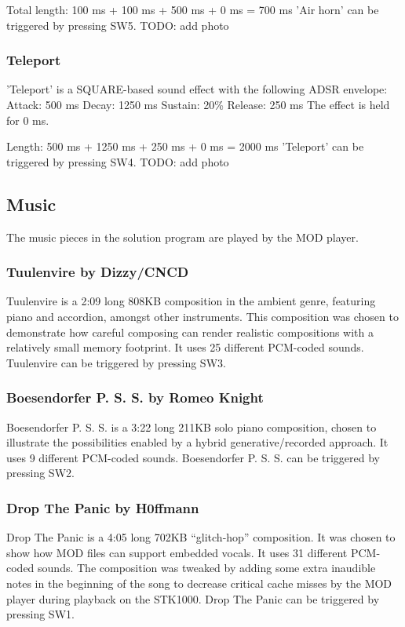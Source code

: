 Total length: 100 ms + 100 ms + 500 ms + 0 ms = 700 ms
'Air horn' can be triggered by pressing SW5.
TODO: add photo

\subsubsection{Teleport}
'Teleport' is a SQUARE-based sound effect with the following ADSR envelope:
Attack: 500 ms
Decay:  1250 ms
Sustain: 20\%
Release: 250 ms
The effect is held for 0 ms.

Length: 500 ms + 1250 ms + 250 ms + 0 ms = 2000 ms
'Teleport' can be triggered by pressing SW4.
TODO: add photo


\subsection{Music}

The music pieces in the solution program are played by the MOD player.

\subsubsection{Tuulenvire by Dizzy/CNCD}
Tuulenvire is a 2:09 long 808KB composition in the ambient genre, featuring piano and accordion, amongst other instruments.
This composition was chosen to demonstrate how careful composing can render realistic compositions with a relatively small memory footprint.
It uses 25 different PCM-coded sounds.
Tuulenvire can be triggered by pressing SW3.

\subsubsection{Boesendorfer P. S. S. by Romeo Knight}
Boesendorfer P. S. S. is a 3:22 long 211KB solo piano composition, chosen to illustrate the possibilities enabled by a hybrid generative/recorded approach.
It uses 9 different PCM-coded sounds.
Boesendorfer P. S. S. can be triggered by pressing SW2.

\subsubsection{Drop The Panic by H0ffmann}
Drop The Panic is a 4:05 long 702KB ``glitch-hop'' composition.
It was chosen to show how MOD files can support embedded vocals.
It uses 31 different PCM-coded sounds.
The composition was tweaked by adding some extra inaudible notes in the beginning of the song to decrease critical cache misses by the MOD player during playback on the STK1000.
Drop The Panic can be triggered by pressing SW1.

